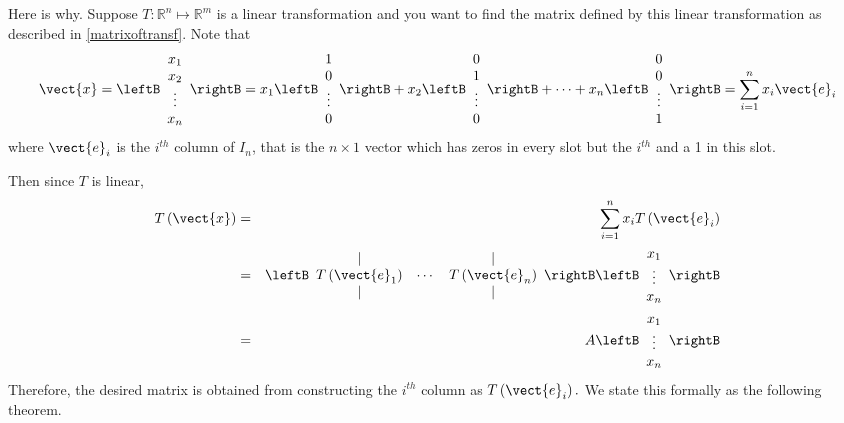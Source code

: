 Here is why. Suppose $T:\mathbb{R}^{n}\mapsto \mathbb{R}^{m}$ is a linear transformation and you want to find
the matrix defined by this linear transformation as described in \ref{matrixoftransf}.
 Note that
\begin{equation*}
\vect{x} =\leftB
\begin{array}{c}
x_{1} \\
x_{2} \\
\vdots \\
x_{n}
\end{array}
\rightB = x_{1}\leftB
\begin{array}{c}
1 \\
0 \\
\vdots \\
0
\end{array}
\rightB + x_{2}\leftB
\begin{array}{c}
0 \\
1 \\
\vdots \\
0
\end{array}
\rightB +\cdots + x_{n}\leftB
\begin{array}{c}
0 \\
0 \\
\vdots \\
1
\end{array}
\rightB = \sum_{i=1}^{n}x_{i}\vect{e}_{i}
\end{equation*}
where $\vect{e}_{i}$ is the $i^{th}$ column of $I_n$, that is the $n \times
1$ vector which has zeros in every slot but the $i^{th}$ and a 1 in
this slot.

Then since $T$ is linear,
\begin{eqnarray*}
T\left( \vect{x} \right)&=&\sum_{i=1}^{n}x_{i}T\left( \vect{e}_{i}\right) \\
&=&\leftB
\begin{array}{ccc}
| &  & | \\
T\left( \vect{e}_{1}\right) & \cdots & T\left( \vect{e}_{n}\right) \\
| &  & |
\end{array}
\rightB \leftB
\begin{array}{c}
x_{1} \\
\vdots \\
x_{n}
\end{array}
\rightB \\
&=& A\leftB
\begin{array}{c}
x_{1} \\
\vdots \\
x_{n}
\end{array}
\rightB
\end{eqnarray*}
Therefore,  the desired matrix is obtained from constructing the $i^{th}$
column as $T\left( \vect{e}_{i}\right) .$ We state this formally as the
following theorem.

